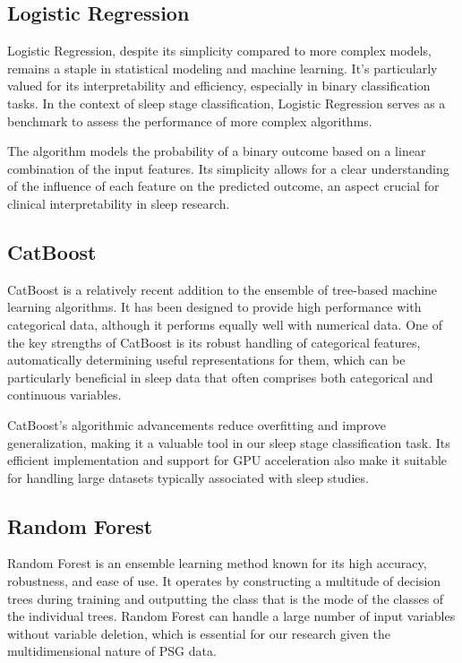 \documentclass[12pt, a4paper,oneside]{book}
\numberwithin{equation}{section}
\begin{document}
\subsection{Logistic Regression}
Logistic Regression, despite its simplicity compared to more complex models, remains a staple in statistical modeling and machine learning. It's particularly valued for its interpretability and efficiency, especially in binary classification tasks. In the context of sleep stage classification, Logistic Regression serves as a benchmark to assess the performance of more complex algorithms.\cite{Hosmer2013}

The algorithm models the probability of a binary outcome based on a linear combination of the input features. Its simplicity allows for a clear understanding of the influence of each feature on the predicted outcome, an aspect crucial for clinical interpretability in sleep research.\cite{Hosmer2013}

\subsection{CatBoost}
CatBoost is a relatively recent addition to the ensemble of tree-based machine learning algorithms. It has been designed to provide high performance with categorical data, although it performs equally well with numerical data. One of the key strengths of CatBoost is its robust handling of categorical features, automatically determining useful representations for them, which can be particularly beneficial in sleep data that often comprises both categorical and continuous variables.\cite{Prokhorenkova2018}

CatBoost's algorithmic advancements reduce overfitting and improve generalization, making it a valuable tool in our sleep stage classification task. Its efficient implementation and support for GPU acceleration also make it suitable for handling large datasets typically associated with sleep studies.\cite{Prokhorenkova2018}

\subsection{Random Forest}
Random Forest is an ensemble learning method known for its high accuracy, robustness, and ease of use. It operates by constructing a multitude of decision trees during training and outputting the class that is the mode of the classes of the individual trees. Random Forest can handle a large number of input variables without variable deletion, which is essential for our research given the multidimensional nature of PSG data.\cite{Breiman2001}
\end{document}
